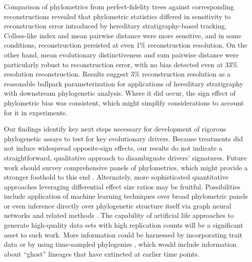 Comparison of phylometrics from perfect-fidelity trees against corresponding reconstructions revealed that phylometric statistics differed in sensitivity to reconstruction error introduced by hereditary stratigraphy-based tracking.
Colless-like index and mean pairwise distance were more sensitive, and in some conditions, reconstruction persisted at even 1\% reconstruction resolution.
On the other hand, mean evolutionary distinctiveness and sum pairwise distance were particularly robust to reconstruction error, with no bias detected even at 33\% resolution reconstruction.
Results suggest 3\% reconstruction resolution as a reasonable ballpark parameterization for applications of hereditary stratigraphy with downstream phylogenetic analysis.
Where it did occur, the sign effect of phylometric bias was consistent, which might simplify considerations to account for it in experiments.

Our findings identify key next steps necessary for development of rigorous phylogenetic assays to test for key evolutionary drivers.
Because treatments did not induce widespread opposite-sign effects, our results do not indicate a straightforward, qualitative approach to disambiguate drivers' signatures.
Future work should survey comprehensive panels of phylometrics, which might provide a stronger foothold to this end \citep{tuckerGuidePhylogeneticMetrics2017}.
Alternately, more sophisticated quantitative approaches leveraging differential effect size ratios may be fruitful.
Possibilities include application of machine learning techniques over broad phylometric panels \citep{voznica2022deep} or even inference directly over phylogenetic structure itself via graph neural networks and related methods \citep{lajaaiti2023comparison}.
The capability of artificial life approaches to generate high-quality data sets with high replication counts will be a significant asset to such work.
More information could be harnessed by incorporating trait data \citep{nozoe2017inferring} or by using time-sampled phylogenies \citep{volz2013viral}, which would include information about ``ghost'' lineages that have extincted at earlier time points.

